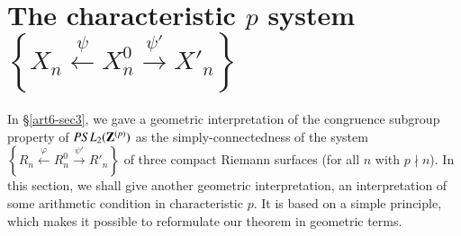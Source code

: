 \section{The characteristic $p$ system $\left\{X_n \xleftarrow{\psi} X^0_n \xrightarrow{\psi'} X'_n \right\}$}\label{art6-sec4}
In \S \ref{art6-sec3}, we gave a geometric interpretation of the congruence subgroup property of $PSL_2 (\mathbf{Z}^{(p)})$ as the simply-connectedness of the system\break  $\left\{R_n \xleftarrow{\varphi} R^0_n \xrightarrow{\psi'} R'_n \right\}$ of three compact Riemann surfaces (for all $n$ with $p \nmid n$). In this section, we shall give another geometric interpretation, an interpretation of some arithmetic condition in characteristic $p$. It is based on a simple principle, which makes it possible to reformulate our theorem in geometric terms.

